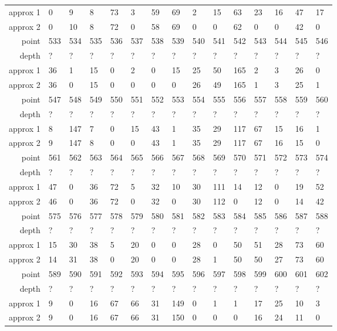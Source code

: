\begin{center}
\begin{supertabular}{|r|l l l l l l l l l l l l l l|}
approx 1 & 0 & 9 & 8 & 73 & 3 & 59 & 69 & 2 & 15 & 63 & 23 & 16 & 47 & 17 \\
approx 2 & 0 & 10 & 8 & 72 & 0 & 58 & 69 & 0 & 0 & 62 & 0 & 0 & 42 & 0 \\
\hline
point & 533 & 534 & 535 & 536 & 537 & 538 & 539 & 540 & 541 & 542 & 543 & 544 & 545 & 546 \\
\hline
depth & ? & ? & ? & ? & ? & ? & ? & ? & ? & ? & ? & ? & ? & ? \\
approx 1 & 36 & 1 & 15 & 0 & 2 & 0 & 15 & 25 & 50 & 165 & 2 & 3 & 26 & 0 \\
approx 2 & 36 & 0 & 15 & 0 & 0 & 0 & 0 & 26 & 49 & 165 & 1 & 3 & 25 & 1 \\
\hline
point & 547 & 548 & 549 & 550 & 551 & 552 & 553 & 554 & 555 & 556 & 557 & 558 & 559 & 560 \\
\hline
depth & ? & ? & ? & ? & ? & ? & ? & ? & ? & ? & ? & ? & ? & ? \\
approx 1 & 8 & 147 & 7 & 0 & 15 & 43 & 1 & 35 & 29 & 117 & 67 & 15 & 16 & 1 \\
approx 2 & 9 & 147 & 8 & 0 & 0 & 43 & 1 & 35 & 29 & 117 & 67 & 16 & 15 & 0 \\
\hline
point & 561 & 562 & 563 & 564 & 565 & 566 & 567 & 568 & 569 & 570 & 571 & 572 & 573 & 574 \\
\hline
depth & ? & ? & ? & ? & ? & ? & ? & ? & ? & ? & ? & ? & ? & ? \\
approx 1 & 47 & 0 & 36 & 72 & 5 & 32 & 10 & 30 & 111 & 14 & 12 & 0 & 19 & 52 \\
approx 2 & 46 & 0 & 36 & 72 & 0 & 32 & 0 & 30 & 112 & 0 & 12 & 0 & 14 & 42 \\
\hline
point & 575 & 576 & 577 & 578 & 579 & 580 & 581 & 582 & 583 & 584 & 585 & 586 & 587 & 588 \\
\hline
depth & ? & ? & ? & ? & ? & ? & ? & ? & ? & ? & ? & ? & ? & ? \\
approx 1 & 15 & 30 & 38 & 5 & 20 & 0 & 0 & 28 & 0 & 50 & 51 & 28 & 73 & 60 \\
approx 2 & 14 & 31 & 38 & 0 & 20 & 0 & 0 & 28 & 1 & 50 & 50 & 27 & 73 & 60 \\
\hline
point & 589 & 590 & 591 & 592 & 593 & 594 & 595 & 596 & 597 & 598 & 599 & 600 & 601 & 602 \\
\hline
depth & ? & ? & ? & ? & ? & ? & ? & ? & ? & ? & ? & ? & ? & ? \\
approx 1 & 9 & 0 & 16 & 67 & 66 & 31 & 149 & 0 & 1 & 1 & 17 & 25 & 10 & 3 \\
approx 2 & 9 & 0 & 16 & 67 & 66 & 31 & 150 & 0 & 0 & 0 & 16 & 24 & 11 & 0 \\

\end{supertabular}
\end{center}
